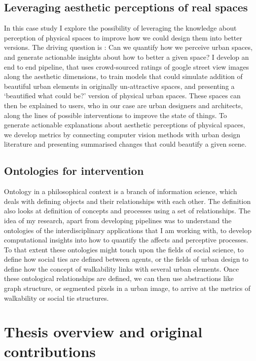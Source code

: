 \subsection{Leveraging aesthetic perceptions of real spaces}
In this case study I explore the possibility of leveraging the knowledge about perception of physical spaces to improve how we could design them into better versions. The driving question is : Can we quantify how we perceive urban spaces, and generate actionable insights about how to better a given space?  I develop an end to end pipeline, that uses crowd-sourced ratings of google street view images along the aesthetic dimensions, to train models that could simulate addition of beautiful urban elements in originally un-attractive spaces, and presenting a `beautified what could be?' version of physical urban spaces. These spaces can then be explained to users, who in our case are urban designers and architects, along the lines of possible interventions to improve the state of things. To generate actionable  explanations about aesthetic perceptions of physical spaces, we develop metrics by connecting computer vision methods with urban design literature and presenting summarised changes that could beautify a given scene. 

\subsection{Ontologies for intervention}
Ontology in a philosophical context is a branch of information science, which deals with defining objects and their relationships with each other. The definition also looks at definition of concepts and processes using a set of relationships. The idea of my research, apart from developing pipelines was to understand the ontologies of the interdisciplinary applications that I am working with, to develop computational insights into how to quantify the affects and perceptive processes. To that extent these ontologies might touch upon the fields of social science, to define how social ties are defined between agents, or the fields of urban design to define how the concept of walkability links with several urban elements. Once these ontological relationships are defined, we can then use abstractions like graph structure, or segmented pixels in a urban image, to arrive at the metrics of walkability or social tie structures.



\section{Thesis overview and original contributions}

